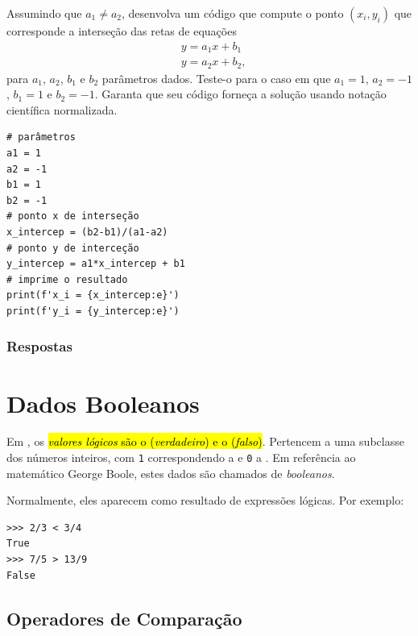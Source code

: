 \begin{exer}
  Assumindo que $a_1\neq a_2$, desenvolva um código {\python} que compute o ponto $(x_{i}, y_i)$ que corresponde a interseção das retas de equações
  \begin{align}
    &y = a_1x + b_1\\
    &y = a_2x + b_2,
  \end{align}
  para $a_1$, $a_2$, $b_1$ e $b_2$ parâmetros dados. Teste-o para o caso em que $a_1=1$, $a_2=-1$, $b_1=1$ e $b_2=-1$. Garanta que seu código forneça a solução usando notação científica normalizada.
\end{exer}
\begin{resp}

\begin{lstlisting}
# parâmetros
a1 = 1
a2 = -1
b1 = 1
b2 = -1
# ponto x de interseção
x_intercep = (b2-b1)/(a1-a2)
# ponto y de interceção
y_intercep = a1*x_intercep + b1
# imprime o resultado
print(f'x_i = {x_intercep:e}')
print(f'y_i = {y_intercep:e}')
\end{lstlisting}

\end{resp}

\ifisbook
\subsubsection{Respostas}
\shipoutAnswer
\fi

\section{Dados Booleanos}\label{cap_lingua_sec_bool}

Em {\python}, os \hl{\emph{valores lógicos} são o {\PYTHONTrue} (\emph{verdadeiro}) e o {\PYTHONFalse} (\emph{falso})}. Pertencem a uma subclasse dos números inteiros, com \lstinline+1+ correspondendo a {\PYTHONTrue} e \lstinline+0+ a {\PYTHONFalse}. Em referência ao matemático George Boole{\boole}, estes dados são chamados de \emph{booleanos}.

Normalmente, eles aparecem como resultado de expressões lógicas. Por exemplo:

\begin{lstlisting}
>>> 2/3 < 3/4
True
>>> 7/5 > 13/9
False
\end{lstlisting}

\subsection{Operadores de Comparação}


